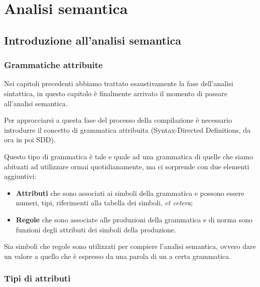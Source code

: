 \documentclass[class=book, crop=false, oneside, 12pt]{standalone}
\begin{document}
\chapter{Analisi semantica}

\section{Introduzione all'analisi semantica}

\subsection{Grammatiche attribuite}
Nei capitoli precedenti abbiamo trattato esaustivamente la fase dell'analisi sintattica, in questo capitolo è finalmente arrivato il momento di passare all'analisi semantica.

Per approcciarsi a questa fase del processo della compilazione è necessario introdurre il concetto di grammatica attribuita (Syntax-Directed Definitions, da ora in poi SDD).

Questo tipo di grammatica è tale e quale ad una grammatica di quelle che siamo abituati ad utilizzare ormai quotidianamente, ma ci sorprende con due elementi aggiuntivi:
\begin{itemize}
    \item \textbf{Attributi} che sono associati ai simboli della grammatica e possono essere numeri, tipi, riferimenti alla tabella dei simboli, \textit{et cetera}; 
    \item \textbf{Regole} che sono associate alle produzioni della grammatica e di norma sono funzioni degli attributi dei simboli della produzione.
\end{itemize}
Sia simboli che regole sono utilizzati per compiere l'analisi semantica, ovvero dare un valore a quello che è espresso da una parola di un a certa grammatica.

\subsection{Tipi di attributi}
\end{document}
